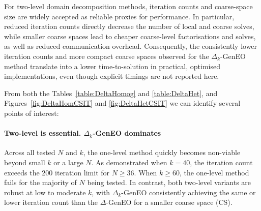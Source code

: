 \documentclass[preprint,3p,times]{elsarticle}
\theoremstyle{definition}
\numberwithin{equation}{section}
\begin{document}
{{For two-level domain decomposition methods, iteration counts and coarse-space size are widely accepted as reliable proxies for performance. 
In particular, reduced iteration counts directly decrease the number of local and coarse solves, while smaller coarse spaces lead to 
cheaper coarse-level factorisations and solves, as well as reduced communication overhead. 
Consequently, the consistently lower iteration counts and more compact coarse spaces observed for the $\Delta_k$-GenEO method translate 
into a lower time-to-solution in practical, optimised implementations, even though explicit timings are not reported here.
}


From both the Tables~\ref{table:DeltaHomog} and \ref{table:DeltaHet}, and Figures~\ref{fig:DeltaHomCSIT} and \ref{fig:DeltaHetCSIT} 
we can identify several points of interest:

\paragraph{Two-level is essential. $\Delta_k$-GenEO dominates}
Across all tested $N$ and $k$, the one-level method quickly becomes non-viable beyond small $k$ or a large $N$. As demonstrated when $k=40$, 
the iteration count exceeds the 200 iteration limit for $N \ge 36$. When $k\ge 60$, the one-level method fails for the majority of $N$ being tested. 
In contrast, both two-level variants are robust at low to moderate $k$, with $\Delta_k$-GenEO consistently achieving the 
same or lower iteration count than the $\Delta$-GenEO for a smaller coarse space (CS).

}
\end{document}
